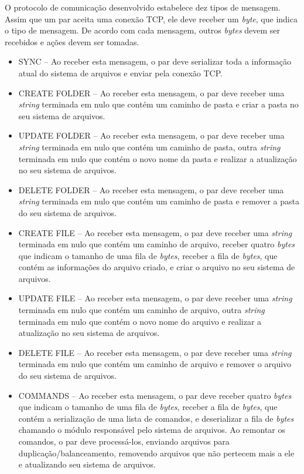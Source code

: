 \documentclass{article}
\begin{document}
\indent

O protocolo de comunicação desenvolvido estabelece dez tipos de mensagem. Assim que um par aceita uma conexão TCP, ele deve receber um \textit{byte}, que indica o tipo de mensagem. De acordo com cada mensagem, outros \textit{bytes} devem ser recebidos e ações devem ser tomadas.

\begin{itemize}
	\item SYNC -- Ao receber esta mensagem, o par deve serializar toda a informação atual do sistema de arquivos e enviar pela conexão TCP.
	\item CREATE FOLDER -- Ao receber esta mensagem, o par deve receber uma \textit{string} terminada em nulo que contém um caminho de pasta e criar a pasta no seu sistema de arquivos.
	\item UPDATE FOLDER -- Ao receber esta mensagem, o par deve receber uma \textit{string} terminada em nulo que contém um caminho de pasta, outra \textit{string} terminada em nulo que contém o novo nome da pasta e realizar a atualização no seu sistema de arquivos.
	\item DELETE FOLDER -- Ao receber esta mensagem, o par deve receber uma \textit{string} terminada em nulo que contém um caminho de pasta e remover a pasta do seu sistema de arquivos.
	\item CREATE FILE -- Ao receber esta mensagem, o par deve receber uma \textit{string} terminada em nulo que contém um caminho de arquivo, receber quatro \textit{bytes} que indicam o tamanho de uma fila de \textit{bytes}, receber a fila de \textit{bytes}, que contém as informações do arquivo criado, e criar o arquivo no seu sistema de arquivos.
	\item UPDATE FILE -- Ao receber esta mensagem, o par deve receber uma \textit{string} terminada em nulo que contém um caminho de arquivo, outra \textit{string} terminada em nulo que contém o novo nome do arquivo e realizar a atualização no seu sistema de arquivos.
	\item DELETE FILE -- Ao receber esta mensagem, o par deve receber uma \textit{string} terminada em nulo que contém um caminho de arquivo e remover o arquivo do seu sistema de arquivos.
	\item COMMANDS -- Ao receber esta mensagem, o par deve receber quatro \textit{bytes} que indicam o tamanho de uma fila de \textit{bytes}, receber a fila de \textit{bytes}, que contém a serialização de uma lista de comandos, e deserializar a fila de \textit{bytes} chamando o módulo responsável pelo sistema de arquivos. Ao remontar os comandos, o par deve processá-los, enviando arquivos para duplicação/balanceamento, removendo arquivos que não pertecem mais a ele e atualizando seu sistema de arquivos.

\end{itemize}
\end{document}
